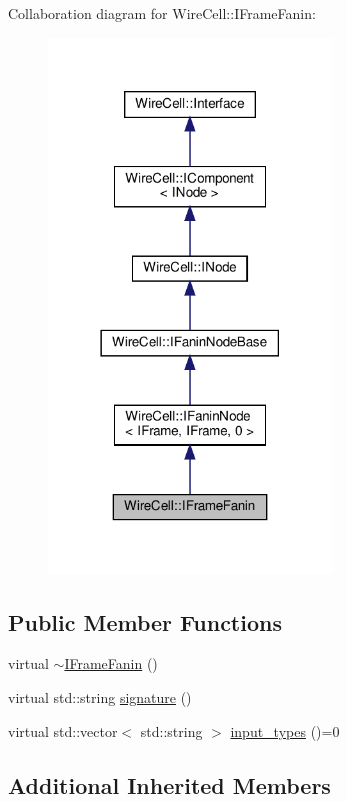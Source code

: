 Collaboration diagram for Wire\+Cell\+:\+:I\+Frame\+Fanin\+:
\nopagebreak
\begin{figure}[H]
\begin{center}
\leavevmode
\includegraphics[width=213pt]{class_wire_cell_1_1_i_frame_fanin__coll__graph}
\end{center}
\end{figure}
\subsection*{Public Member Functions}
\begin{DoxyCompactItemize}
\item 
virtual \hyperlink{class_wire_cell_1_1_i_frame_fanin_a1b24fd96d0cbe8d8ba2572e751b1f844}{$\sim$\+I\+Frame\+Fanin} ()
\item 
virtual std\+::string \hyperlink{class_wire_cell_1_1_i_frame_fanin_aebfb010bd1a132b11af4c25785e779bb}{signature} ()
\item 
virtual std\+::vector$<$ std\+::string $>$ \hyperlink{class_wire_cell_1_1_i_frame_fanin_a7c19800cac1dc1bf67199b067811f500}{input\+\_\+types} ()=0
\end{DoxyCompactItemize}
\subsection*{Additional Inherited Members}


